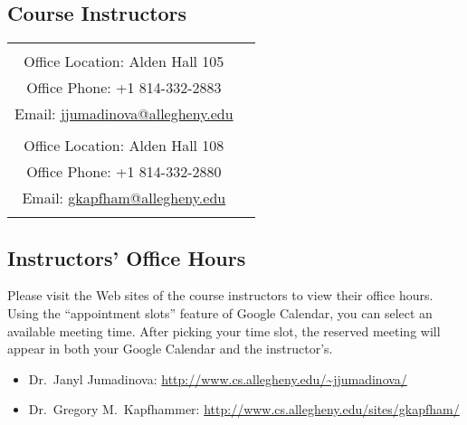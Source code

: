 



\subsection*{Course Instructors}

\begin{tabular}{c c}

\begin{minipage}{4in}
Dr.\ Janyl Jumadinovaa\\
\noindent Office Location: Alden Hall 105 \\
\noindent Office Phone: +1 814-332-2883 \\
\noindent Email: \url{jjumadinova@allegheny.edu} \\
\end{minipage} &

\begin{minipage}{4in}
Dr.\ Gregory M.\ Kapfhammer\\
\noindent Office Location: Alden Hall 108 \\
\noindent Office Phone: +1 814-332-2880 \\
\noindent Email: \url{gkapfham@allegheny.edu} \\
\end{minipage}

\end{tabular}
\vspace*{-.3in}

\subsection*{Instructors' Office Hours}

Please visit the Web sites of the course instructors to view their office hours.  Using the ``appointment slots''
feature of Google Calendar, you can select an available meeting time. After picking your time slot, the reserved meeting
will appear in both your Google Calendar and the instructor's.

\begin{itemize}
	\itemsep 0em
        \item Dr.\ Janyl Jumadinova: \url{http://www.cs.allegheny.edu/~jjumadinova/}
        \item Dr.\ Gregory M.\ Kapfhammer: \url{http://www.cs.allegheny.edu/sites/gkapfham/}
\end{itemize}

